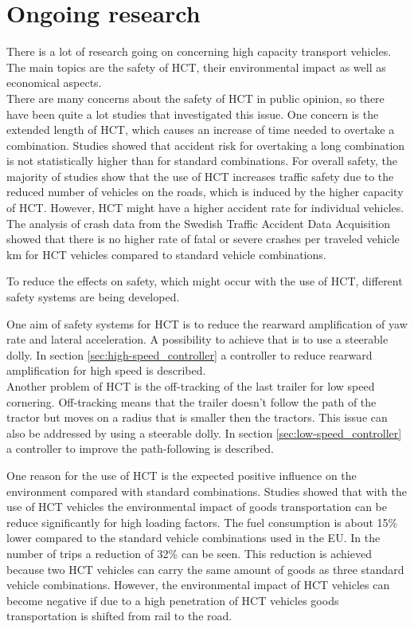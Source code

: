 \documentclass[ExampleMasters.tex]{subfiles}
\begin{document}
\section{Ongoing research}
\label{sec:ongoing_research}
There is a lot of research going on concerning high capacity transport vehicles. The main topics are the safety of HCT, their environmental impact as well as economical aspects.\\

There are many concerns about the safety of HCT in public opinion, so there have been quite a lot studies that investigated this issue. One concern is the extended length of HCT, which causes an increase of time needed to overtake a combination. Studies showed that accident risk for overtaking a long combination is not statistically higher than for standard combinations. \cite{EMS}
For overall safety, the majority of studies show that the use of HCT increases traffic safety due to the reduced number of vehicles on the roads, which is induced by the higher capacity of HCT. However, HCT might have a higher accident rate for individual vehicles. \cite{EMS}
The analysis of crash data from the Swedish Traffic Accident Data Acquisition showed that there is no higher rate of fatal or severe crashes per traveled vehicle km for HCT vehicles compared to standard vehicle combinations. \cite{balint2013correlation}

To reduce the effects on safety, which might occur with the use of HCT, different safety systems are being developed.

One aim of safety systems for HCT is to reduce the rearward amplification of yaw rate and lateral acceleration. A possibility to achieve that is to use a steerable dolly. In section \ref{sec:high-speed_controller} a controller to reduce rearward amplification for high speed is described.\\
Another problem of HCT is the off-tracking of the last trailer for low speed cornering. Off-tracking means that the trailer doesn't follow the path of the tractor but moves on a radius that is smaller then the tractors. This issue can also be addressed by using a steerable dolly. In section \ref{sec:low-speed_controller} a controller to improve the path-following is described.

One reason for the use of HCT is the expected positive influence on the environment compared with standard combinations. 
Studies showed that with the use of HCT vehicles the environmental impact of goods transportation can be reduce significantly for high loading factors. The fuel consumption is about 15\% lower compared to the standard vehicle combinations used in the EU. In the number of trips a reduction of 32\% can be seen. This reduction is achieved because two HCT vehicles can carry the same amount of goods as three standard vehicle combinations.  \cite{backman2002improved}
However, the environmental impact of HCT vehicles can become negative if due to a high penetration of HCT vehicles goods transportation is shifted from rail to the road. \cite{doll2009long}
\end{document}
